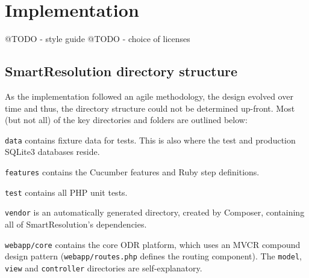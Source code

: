 \chapter{Implementation} %

@TODO - style guide
@TODO - choice of licenses


\section{SmartResolution directory structure}

As the implementation followed an agile methodology, the design evolved over time and thus, the directory structure could not be determined up-front. Most (but not all) of the key directories and folders are outlined below:

\begin{samepage}
\end{samepage}

\lstinline{data} contains fixture data for tests. This is also where the test and production SQLite3 databases reside.

\lstinline{features} contains the Cucumber features and Ruby step definitions.

\lstinline{test} contains all PHP unit tests.

\lstinline{vendor} is an automatically generated directory, created by Composer, containing all of SmartResolution's dependencies.

\lstinline{webapp/core} contains the core ODR platform, which uses an MVCR compound design pattern (\lstinline{webapp/routes.php} defines the routing component). The \lstinline{model}, \lstinline{view} and \lstinline{controller} directories are self-explanatory.

